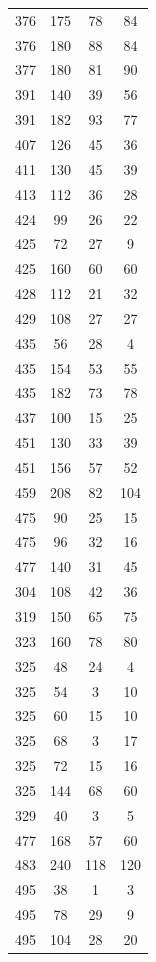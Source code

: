 \documentclass[12pt]{amsproc} %
\theoremstyle{definition}\newtheorem{defn}[thm]{Definition}
\theoremstyle{definition}\newtheorem{rem}[thm]{Remark}
\theoremstyle{definition}\newtheorem{ex}[thm]{Example}
\begin{document}
\begin{table}[ht!]
    \centering
    \begin{minipage}{0.25\textwidth}
        \centering
        \begin{tabular}{c|c|c|c}
      376&175&78&84\\ 
      376&180&88&84\\ 
      377&180&81&90\\ 
      391&140&39&56\\ 
      391&182&93&77\\ 
      407&126&45&36\\ 
      411&130&45&39\\ 
      413&112&36&28\\ 
      424&99&26&22\\ 
      425&72&27&9\\ 
      425&160&60&60\\ 
      428&112&21&32\\ 
      429&108&27&27\\ 
      435&56&28&4\\ 
      435&154&53&55\\ 
      435&182&73&78\\ 
      437&100&15&25\\ 
      451&130&33&39\\
      451&156&57&52\\ 
      459&208&82&104\\ 
      475&90&25&15\\ 
      475&96&32&16\\ 
      477&140&31&45\\  
      304&108&42&36\\ 
      319&150&65&75\\ 
      323&160&78&80\\ 
      325&48&24&4\\ 
      325&54&3&10\\ 
      325&60&15&10\\ 
      325&68&3&17\\ 
      325&72&15&16\\ 
      325&144&68&60\\ 
      329&40&3&5\\ 
      477&168&57&60\\ 
      483&240&118&120\\ 
      495&38&1&3\\ 
      495&78&29&9\\ 
      495&104&28&20\\ 

\end{tabular}
\end{minipage}
\end{table}
\end{document}
